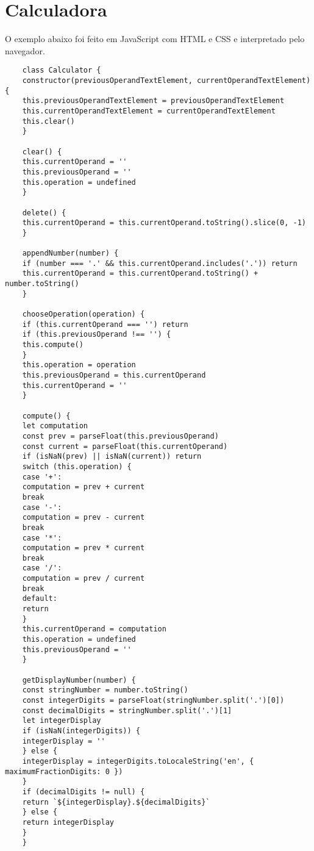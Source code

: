     \section{Calculadora}
    O exemplo abaixo foi feito em JavaScript com HTML e CSS e interpretado pelo navegador.
    \begin{lstlisting}
    class Calculator {
    constructor(previousOperandTextElement, currentOperandTextElement) {
    this.previousOperandTextElement = previousOperandTextElement
    this.currentOperandTextElement = currentOperandTextElement
    this.clear()
    }
    
    clear() {
    this.currentOperand = ''
    this.previousOperand = ''
    this.operation = undefined
    }
    
    delete() {
    this.currentOperand = this.currentOperand.toString().slice(0, -1)
    }
    
    appendNumber(number) {
    if (number === '.' && this.currentOperand.includes('.')) return
    this.currentOperand = this.currentOperand.toString() + number.toString()
    }
    
    chooseOperation(operation) {
    if (this.currentOperand === '') return
    if (this.previousOperand !== '') {
    this.compute()
    }
    this.operation = operation
    this.previousOperand = this.currentOperand
    this.currentOperand = ''
    }
    
    compute() {
    let computation
    const prev = parseFloat(this.previousOperand)
    const current = parseFloat(this.currentOperand)
    if (isNaN(prev) || isNaN(current)) return
    switch (this.operation) {
    case '+':
    computation = prev + current
    break
    case '-':
    computation = prev - current
    break
    case '*':
    computation = prev * current
    break
    case '/':
    computation = prev / current
    break
    default:
    return
    }
    this.currentOperand = computation
    this.operation = undefined
    this.previousOperand = ''
    }
    
    getDisplayNumber(number) {
    const stringNumber = number.toString()
    const integerDigits = parseFloat(stringNumber.split('.')[0])
    const decimalDigits = stringNumber.split('.')[1]
    let integerDisplay
    if (isNaN(integerDigits)) {
    integerDisplay = ''
    } else {
    integerDisplay = integerDigits.toLocaleString('en', { maximumFractionDigits: 0 })
    }
    if (decimalDigits != null) {
    return `${integerDisplay}.${decimalDigits}`
    } else {
    return integerDisplay
    }
    }
    

\end{lstlisting}
